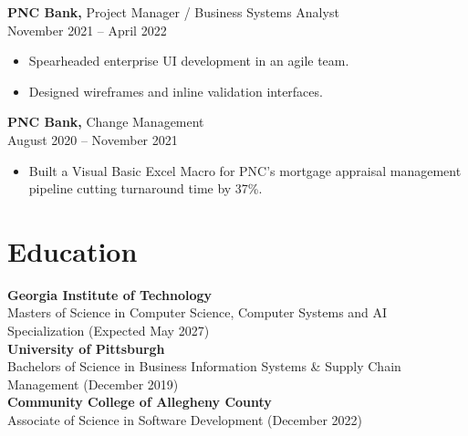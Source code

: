 \documentclass[10pt,a4paper]{article}
\begin{document}
\begin{minipage}[t]{0.68\textwidth}
\vspace{0.25cm}

\textbf{PNC Bank,} Project Manager / Business Systems Analyst\\
November 2021 – April 2022
\vspace{0.15cm}
\begin{itemize}[leftmargin=*, nosep]
  \item Spearheaded enterprise UI development in an agile team.
  \item Designed wireframes and inline validation interfaces.
\end{itemize}

\vspace{0.25cm}

\textbf{PNC Bank,} Change Management\\
August 2020 – November 2021
\vspace{0.15cm}
\begin{itemize}[leftmargin=*, nosep]
  \item Built a Visual Basic Excel Macro for PNC's mortgage appraisal management pipeline cutting turnaround time by 37\%.
\end{itemize}

\vspace{0.5cm}

\section*{Education}
\vspace{0.15cm}
\textbf{Georgia Institute of Technology} \\
Masters of Science in Computer Science, Computer Systems and AI Specialization (Expected May 2027)\\[4pt]
\vspace{0.15cm}
\textbf{University of Pittsburgh} \\
Bachelors of Science in Business Information Systems \& Supply Chain Management (December 2019)\\[4pt]
\vspace{0.15cm}
\textbf{Community College of Allegheny County} \\
Associate of Science in Software Development (December 2022)\\[4pt]

\end{minipage}
\hfill
\end{document}
